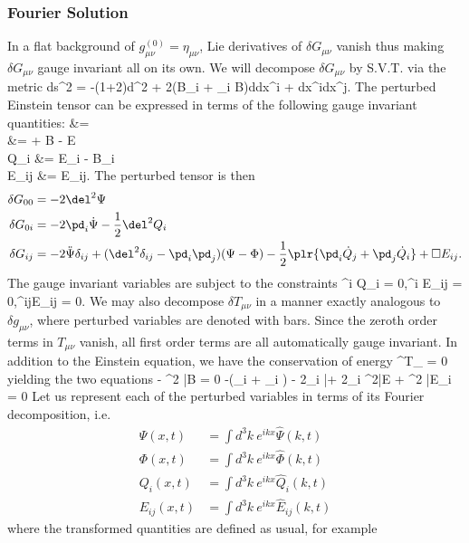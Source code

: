 \documentclass[10pt,letterpaper]{article}
\begin{document}
\subsubsection{Fourier Solution}
In a flat background of $g_{\mu\nu}^{(0)} = \eta_{\mu\nu}$, Lie derivatives of $\delta G_{\mu\nu}$ vanish thus making $\delta G_{\mu\nu}$ gauge invariant all on its own. We will decompose $\delta G_{\mu\nu}$ by S.V.T. via the metric
\be
	ds^2 = -(1+2\phi)d\tau^2 + 2(B_i + \pd_i B)d\tau dx^i + dx^idx^j.
\ee
The perturbed Einstein tensor can be expressed in terms of the following gauge invariant quantities:
\ba
	\Psi &= \psi\\
	\Phi &= \phi + \dot B - \ddot E\\
	Q_i &= \dot E_i - B_i\\
	E_{ij} &= E_{ij}.
\ea
The perturbed tensor is then 
\begin{align}
	\delta G_{00} &= -2\del^2 \Psi \\
	\delta G_{0i}  &= -2\pd_i \dot \Psi - \frac12 \del^2Q_i \\
	\delta G_{ij} &= -2\ddot \Psi \delta_{ij} + (\del^2\delta_{ij}-\pd_i \pd_j)(\Psi - \Phi) - \frac12\plr{\pd_i \dot Q_j+\pd_j \dot Q_i}  + \Box E_{ij}.
\end{align}
The gauge invariant variables are subject to the constraints
\be
	\pd^i Q_i = 0,\qquad \pd^i E_{ij} = 0,\qquad \delta^{ij}E_{ij} = 0.
\ee
We may also decompose $\delta T_{\mu\nu}$ in a manner exactly analogous to $\delta g_{\mu\nu}$, where perturbed variables are denoted with bars. Since the zeroth order terms in $T_{\mu\nu}$ vanish, all first order terms are all automatically gauge invariant. In addition to the Einstein equation, we have the conservation of energy
\be
	\pd^\mu \delta T_{\mu\nu} = 0
\ee
yielding the two equations
\dot{\bar{\phi}} - \del^2 \bar B = 0
\ee
\be
	-(_i + \pd_i ) - 2\pd_i \bar\psi + 2\pd_i \del^2\bar E + \del^2 \bar{E}_i = 0
\ee
Let us represent each of the perturbed variables in terms of its Fourier decomposition, i.e.
\begin{align}
	\Psi(x,t) &= \int d^3k\  e^{ikx} \hat \Psi(k,t)\\
	\Phi(x,t) &= \int d^3k\  e^{ikx} \hat \Phi(k,t)\\
	Q_i(x,t)&= \int d^3k\  e^{ikx} \hat Q_i(k,t)\\
	E_{ij}(x,t) &= \int d^3k\  e^{ikx} \hat E_{ij}(k,t)
\end{align}
where the transformed quantities are defined as usual, for example
\end{document}
